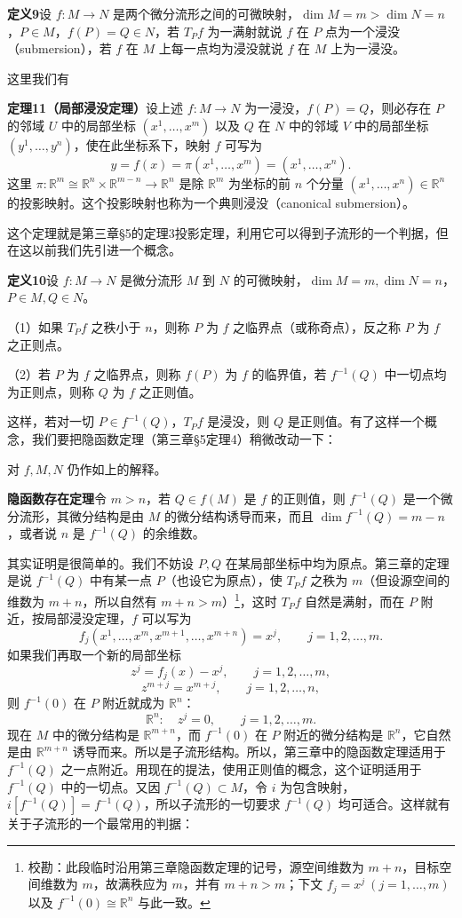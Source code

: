 \noindent\textbf{定义9}\quad 设 $f:M\to N$ 是两个微分流形之间的可微映射，$\dim M=m>\dim N=n$，$P\in M$，$f(P)=Q\in N$，若 $T_Pf$ 为一满射就说 $f$ 在 $P$ 点为一个浸没（submersion），若 $f$ 在 $M$ 上每一点均为浸没就说 $f$ 在 $M$ 上为一浸没。

这里我们有

\noindent\textbf{定理11（局部浸没定理）}\quad 设上述 $f:M\to N$ 为一浸没，$f(P)=Q$，则必存在 $P$ 的邻域 $U$ 中的局部坐标 $(x^1,\ldots,x^m)$ 以及 $Q$ 在 $N$ 中的邻域 $V$ 中的局部坐标 $(y^1,\ldots,y^n)$，使在此坐标系下，映射 $f$ 可写为
\begin{equation}
 y=f(x)=\pi(x^1,\ldots,x^m)=(x^1,\ldots,x^n).
 \tag{33}
\end{equation}
这里 $\pi:\mathbb R^m\cong\mathbb R^n\times\mathbb R^{m-n}\to\mathbb R^n$ 是除 $\mathbb R^m$ 为坐标的前 $n$ 个分量 $(x^1,\ldots,x^n)\in\mathbb R^n$ 的投影映射。这个投影映射也称为一个典则浸没（canonical submersion）。

这个定理就是第三章§5的定理3投影定理，利用它可以得到子流形的一个判据，但在这以前我们先引进一个概念。

\noindent\textbf{定义10}\quad 设 $f:M\to N$ 是微分流形 $M$ 到 $N$ 的可微映射，$\dim M=m,\dim N=n$，$P\in M,Q\in N$。

（1）如果 $T_Pf$ 之秩小于 $n$，则称 $P$ 为 $f$ 之临界点（或称奇点），反之称 $P$ 为 $f$ 之正则点。

（2）若 $P$ 为 $f$ 之临界点，则称 $f(P)$ 为 $f$ 的临界值，若 $f^{-1}(Q)$ 中一切点均为正则点，则称 $Q$ 为 $f$ 之正则值。

这样，若对一切 $P\in f^{-1}(Q)$，$T_Pf$ 是浸没，则 $Q$ 是正则值。有了这样一个概念，我们要把隐函数定理（第三章§5定理4）稍微改动一下：

对 $f,M,N$ 仍作如上的解释。

\noindent\textbf{隐函数存在定理}\quad 令 $m>n$，若 $Q\in f(M)$ 是 $f$ 的正则值，则 $f^{-1}(Q)$ 是一个微分流形，其微分结构是由 $M$ 的微分结构诱导而来，而且 $\dim f^{-1}(Q)=m-n$，或者说 $n$ 是 $f^{-1}(Q)$ 的余维数。

其实证明是很简单的。我们不妨设 $P,Q$ 在某局部坐标中均为原点。第三章的定理是说 $f^{-1}(Q)$ 中有某一点 $P$（也设它为原点），使 $T_Pf$ 之秩为 $m$（但设源空间的维数为 $m+n$，所以自然有 $m+n>m$）\footnote{校勘：此段临时沿用第三章隐函数定理的记号，源空间维数为 $m+n$，目标空间维数为 $m$，故满秩应为 $m$，并有 $m+n>m$；下文 $f_j=x^j\ (j=1,\ldots,m)$ 以及 $f^{-1}(0)\cong\mathbb R^n$ 与此一致。}，这时 $T_Pf$ 自然是满射，而在 $P$ 附近，按局部浸没定理，$f$ 可以写为
\[
 f_j(x^1,\ldots,x^m,x^{m+1},\ldots,x^{m+n})=x^j,
 \qquad j=1,2,\ldots,m.
\]
如果我们再取一个新的局部坐标
\[
 z^j=f_j(x)-x^j,
 \qquad j=1,2,\ldots,m,
\]
\[
 z^{m+j}=x^{m+j},
 \qquad j=1,2,\ldots,n,
\]
则 $f^{-1}(0)$ 在 $P$ 附近就成为 $\mathbb R^n$：
\[
 \mathbb R^n:\quad z^j=0,
 \qquad j=1,2,\ldots,m.
\]
现在 $M$ 中的微分结构是 $\mathbb R^{m+n}$，而 $f^{-1}(0)$ 在 $P$ 附近的微分结构是 $\mathbb R^n$，它自然是由 $\mathbb R^{m+n}$ 诱导而来。所以是子流形结构。所以，第三章中的隐函数定理适用于 $f^{-1}(Q)$ 之一点附近。用现在的提法，使用正则值的概念，这个证明适用于 $f^{-1}(Q)$ 中的一切点。又因 $f^{-1}(Q)\subset M$，令 $i$ 为包含映射，$i[f^{-1}(Q)]=f^{-1}(Q)$，所以子流形的一切要求 $f^{-1}(Q)$ 均可适合。这样就有关于子流形的一个最常用的判据：

